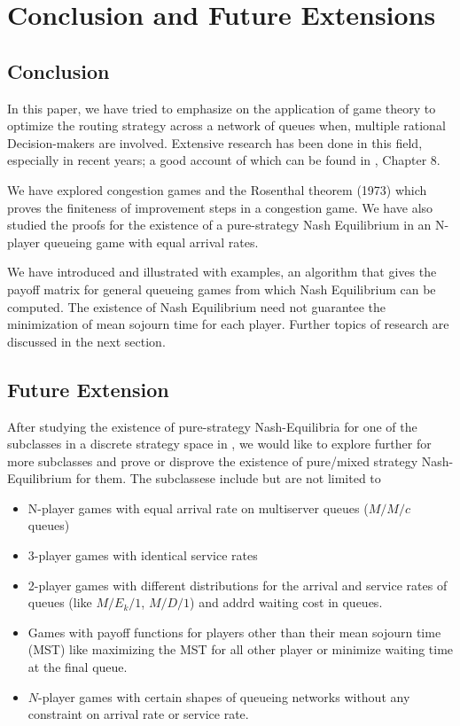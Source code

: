 \chapter{Conclusion and Future Extensions}

\section{Conclusion}
In this paper, we have tried to emphasize on the application of game theory to optimize the routing strategy across a network of queues when, multiple rational Decision-makers are involved. Extensive research has been done in this field, especially in recent years; a good account of which can be found in \cite{rqhassin}, Chapter 8.

We have explored congestion games and the Rosenthal theorem (1973) which proves the finiteness of improvement steps in a congestion game. We have also studied the proofs for the existence of a pure-strategy Nash Equilibrium in an N-player queueing game with equal arrival rates.

We have introduced and illustrated with examples, an algorithm that gives the payoff matrix for general queueing games from which Nash Equilibrium can be computed. The existence of Nash Equilibrium need not guarantee the minimization of mean sojourn time for each player. Further topics of research are discussed in the next section.


\section{Future Extension}
After studying the existence of pure-strategy Nash-Equilibria for one of the subclasses in a discrete strategy space in \cite{laan}, we would like to explore further for more subclasses and prove or disprove the existence of pure/mixed strategy Nash-Equilibrium for them. The subclassese include but are not limited to
\begin{itemize}
    \item N-player games with equal arrival rate on multiserver queues ($M/M/c$ queues)
    \item 3-player games with identical service rates
    \item 2-player games with different distributions for the arrival and service rates of queues (like $M/E_k/1$, $M/D/1$) and addrd waiting cost in queues.
    \item Games with payoff functions for players other than their mean sojourn time (MST) like maximizing the MST for all other player or minimize waiting time at the final queue.
    \item $N$-player games with certain shapes of queueing networks without any constraint on arrival rate or service rate.
\end{itemize}








